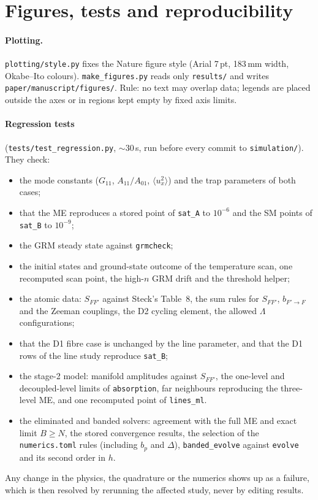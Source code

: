 \documentclass[11pt,a4paper]{article}
\newcommand{\code}[1]{\texttt{#1}}
\begin{document}
\section{Figures, tests and reproducibility}
\paragraph{Plotting.} \code{plotting/style.py} fixes the Nature figure style (Arial 7\,pt, 183\,mm width, Okabe--Ito colours). \code{make\_figures.py} reads only \code{results/} and writes \code{paper/manuscript/figures/}. Rule: no text may overlap data; legends are placed outside the axes or in regions kept empty by fixed axis limits.

\paragraph{Regression tests} (\code{tests/test\_regression.py}, $\sim30$\,s, run before every commit to \code{simulation/}). They check:
\begin{itemize}
\item the mode constants ($G_{11}$, $A_{11}/A_{01}$, $\langle u_x^2\rangle$) and the trap parameters of both cases;
\item that the ME reproduces a stored point of \code{sat\_A} to $10^{-6}$ and the SM points of \code{sat\_B} to $10^{-9}$;
\item the GRM steady state against \code{grmcheck};
\item the initial states and ground-state outcome of the temperature scan, one recomputed scan point, the high-$n$ GRM drift and the threshold helper;
\item the atomic data: $S_{FF'}$ against Steck's Table~8, the sum rules for $S_{FF'}$, $b_{F'\to F}$ and the Zeeman couplings, the D2 cycling element, the allowed $\Lambda$ configurations;
\item that the D1 fibre case is unchanged by the line parameter, and that the D1 rows of the line study reproduce \code{sat\_B};
\item the stage-2 model: manifold amplitudes against $S_{FF'}$, the one-level and decoupled-level limits of \code{absorption}, far neighbours reproducing the three-level ME, and one recomputed point of \code{lines\_ml}.
\item the eliminated and banded solvers: agreement with the full ME and exact limit $B\ge N$, the stored convergence results, the selection of the \code{numerics.toml} rules (including $b_p$ and $\Delta$), \code{banded\_evolve} against \code{evolve} and its second order in $h$.
\end{itemize}
Any change in the physics, the quadrature or the numerics shows up as a failure, which is then resolved by rerunning the affected study, never by editing results.
\end{document}
